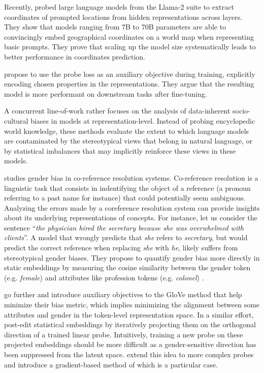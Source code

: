Recently, \citet{gurnee2023language} probed large language models from the Llama-2 suite \citep{touvron2023llama} to extract coordinates of prompted locations from hidden representations across layers. They show that models ranging from 7B to 70B parameters are able to convincingly embed geographical coordinates on a world map when representing basic prompts. They prove that scaling up the model size systematically leads to better performance in coordinates prediction.

\citet{peters-etal-2019-knowledge} propose to use the probe loss as an auxiliary objective during training, explicitly encoding chosen properties in the representations. They argue that the resulting model is more performant on downstream tasks after fine-tuning.

A concurrent line-of-work rather focuses on the analysis of data-inherent socio-cultural biases in models at representation-level. Instead of probing encyclopedic world knowledge, these methods evaluate the extent to which language models are contaminated by the stereotypical views that belong in natural language, or by statistical imbalances that may implicitly reinforce these views in these models.

\citet{zhao-etal-2018-gender} studies gender bias in co-reference resolution systems. Co-reference resolution is a linguistic task that consists in indentifying the object of a reference (a pronoun referring to a past name for instance) that could potentially seem ambiguous. Analyzing the errors made by a coreference resolution system can provide insights about its underlying representations of concepts. For instance, let us consider the sentence ``\textit{the physician hired the secretary because she was overwhelmed with clients}''. A model that wrongly predicts that \textit{she} refers to \textit{secretary}, but would predict the correct reference when replacing \textit{she} with \textit{he}, likely suffers from stereotypical gender biases. They propose to quantify gender bias more directly in static embeddings by measuring the cosine similarity between the gender token (e.g. \textit{female}) and attributes like profession tokens (e.g. \textit{colonel}) \citep{zhao-etal-2018-learning}.

\citet{zhao-etal-2018-learning} go further and introduce auxiliary objectives to the GloVe method that help minimize their bias metric, which implies minimizing the alignment between some attributes and gender in the token-level representation space. In a similar effort, \citet{ravfogel-etal-2020-null} post-edit statistical embeddings by iteratively projecting them on the orthogonal direction of a trained linear probe. Intuitively, training a new probe on these projected embeddings should be more difficult as a gender-sensitive direction has been suppressed from the latent space. \citet{iskander-etal-2023-shielded} extend this idea to more complex probes and introduce a gradient-based method of which \citet{ravfogel-etal-2020-null} is a particular case.





